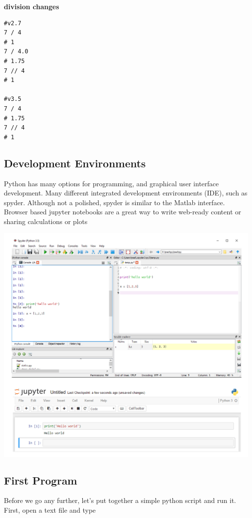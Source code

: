 \documentclass[%
oneside,                 %
final,                   %
10pt]{article}
\begin{document}
\textbf{division changes}
\begin{Verbatim}[numbers=none,fontsize=\fontsize{9pt}{9pt},baselinestretch=0.95,xleftmargin=2mm]
#v2.7
7 / 4
# 1
7 / 4.0
# 1.75
7 // 4
# 1

#v3.5
7 / 4
# 1.75
7 // 4
# 1
\end{Verbatim}

\subsection{Development Environments}

Python has many options for programming, and graphical user interface development. Many different integrated development environments (IDE), such as spyder. Although not a polished, spyder is similar to the Matlab interface. Browser based jupyter notebooks are a great way to write web-ready content or sharing calculations or plots



\centerline{\includegraphics[width=0.9\linewidth]{fig/jupyterspyder.png}}




\subsection{First Program}

Before we go any further, let's put together a simple python script and run it. First, open a text file and type
\end{document}
